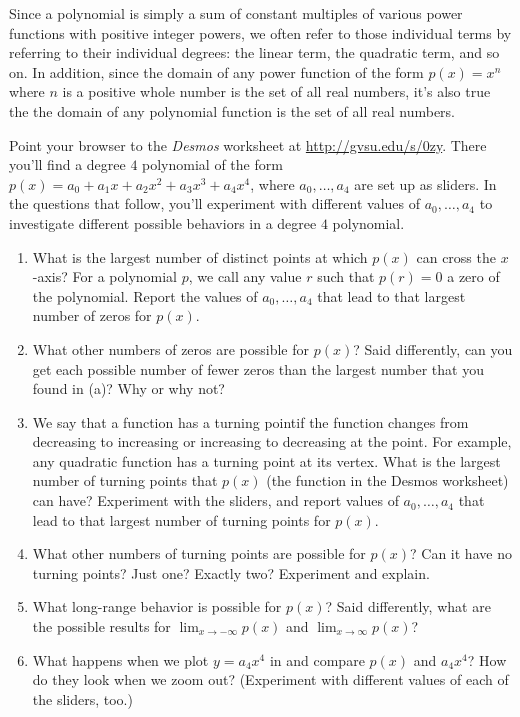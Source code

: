 \documentclass{ximera}
\begin{document}
Since a polynomial is simply a sum of constant multiples of various power functions with positive integer powers, we often refer to those individual terms by referring to their individual degrees:  the linear term, the quadratic term, and so on.  In addition, since the domain of any power function of the form $p(x) = x^n$ where $n$ is a positive whole number is the set of all real numbers, it's also true the the domain of any polynomial function is the set of all real numbers.%
\begin{exploration}
Point your browser to the \emph{Desmos} worksheet at \href{http://gvsu.edu/s/0zy}{http://gvsu.edu/s/0zy}.  There you'll find a degree $4$ polynomial of the form $p(x) = a_0 + a_1x + a_2x^2 + a_3x^3 + a_4x^4$, where $a_0, \ldots, a_4$ are set up as sliders.  In the questions that follow, you'll experiment with different values of $a_0, \ldots, a_4$ to investigate different possible behaviors in a degree $4$ polynomial.%
\begin{enumerate}
\item What is the largest number of distinct points at which $p(x)$ can cross the $x$-axis?%
For a polynomial $p$, we call any value $r$ such that $p(r) = 0$ a zero of the polynomial.  Report the values of $a_0, \ldots, a_4$ that lead to that largest number of zeros for $p(x)$.%
\item What other numbers of zeros are possible for $p(x)$?  Said differently, can you get each possible number of fewer zeros than the largest number that you found in (a)? Why or why not?
\item We say that a function has a turning pointif the function changes from decreasing to increasing or increasing to decreasing at the point.  For example, any quadratic function has a turning point at its vertex.%
What is the largest number of turning points that $p(x)$ (the function in the Desmos worksheet) can have?  Experiment with the sliders, and report values of $a_0, \ldots, a_4$ that lead to that largest number of turning points for $p(x)$.%
\item What other numbers of turning points are possible for $p(x)$? Can it have no turning points?  Just one?  Exactly two? Experiment and explain.%
\item What long-range behavior is possible for $p(x)$?  Said differently, what are the possible results for $\displaystyle \lim_{x \to -\infty} p(x)$ and $\displaystyle \lim_{x \to \infty} p(x)$?%
\item What happens when we plot $y = a_4 x^4$ in and compare $p(x)$ and $a_4 x^4$?  How do they look when we zoom out? (Experiment with different values of each of the sliders, too.)
\end{enumerate}
\end{exploration}
\end{document}
